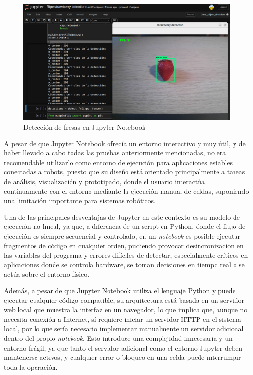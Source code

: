  \begin{figure}[H]
     \centering
     \begin{center}
       \includegraphics[width=140mm]{figs/Coordenadas centrales deteccion JN.png}
     \end{center}
     \caption{Detección de fresas en Jupyter Notebook}
    \label{fig:Coord_JN}
  \end{figure}

A pesar de que Jupyter Notebook ofrecía un entorno interactivo y muy útil, y de haber llevado a cabo todas las pruebas anteriormente mencionadas, no era recomendable utilizarlo como entorno de ejecución para aplicaciones estables conectadas a robots, puesto que su diseño está orientado principalmente a tareas de análisis, visualización y prototipado, donde el usuario interactúa continuamente con el entorno mediante la ejecución manual de celdas, suponiendo una limitación importante para sistemas robóticos. 

Una de las principales desventajas de Jupyter en este contexto es su modelo de ejecución no lineal, ya que, a diferencia de un script en Python, donde el flujo de ejecución es siempre secuencial y controlado, en un \textit{notebook} es posible ejecutar fragmentos de código en cualquier orden, pudiendo provocar desincronización en las variables del programa y errores difíciles de detectar, especialmente críticos en aplicaciones donde se controla hardware, se toman decisiones en tiempo real o se actúa sobre el entorno físico. 

Además, a pesar de que Jupyter Notebook utiliza el lenguaje Python y puede ejecutar cualquier código compatible, su arquitectura está basada en un servidor web local que muestra la interfaz en un navegador, lo que implica que, aunque no necesita conexión a Internet, sí requiere iniciar un servidor HTTP en el sistema local, por lo que sería necesario implementar manualmente un servidor adicional dentro del propio \textit{notebook}. Esto introduce una complejidad innecesaria y un entorno frágil, ya que tanto el servidor adicional como el entorno Jupyter deben mantenerse activos, y cualquier error o bloqueo en una celda puede interrumpir toda la operación.

